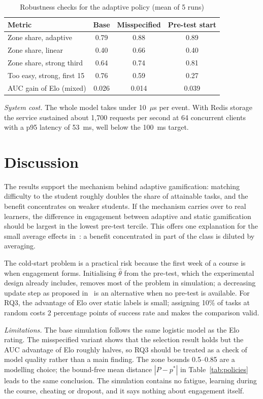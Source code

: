 \documentclass[conference]{IEEEtran}
\begin{document}
\begin{table}[t]
\caption{Robustness checks for the adaptive policy (mean of 5 runs)}
\label{tab:robust}
\centering
\begin{tabular}{@{}lccc@{}}
\toprule
Metric & Base & Misspecified & Pre-test start \\
\midrule
Zone share, adaptive & 0.79 & 0.88 & 0.89 \\
Zone share, linear & 0.40 & 0.66 & 0.40 \\
Zone share, strong third & 0.64 & 0.74 & 0.81 \\
Too easy, strong, first 15 & 0.76 & 0.59 & 0.27 \\
AUC gain of Elo (mixed) & 0.026 & 0.014 & 0.039 \\
\bottomrule
\end{tabular}
\end{table}

\textit{System cost.} The whole model takes under 10~$\mu$s per event. With Redis storage the service sustained about 1,700 requests per second at 64 concurrent clients with a p95 latency of 53~ms, well below the 100~ms target.

\section{Discussion}
The results support the mechanism behind adaptive gamification: matching difficulty to the student roughly doubles the share of attainable tasks, and the benefit concentrates on weaker students. If the mechanism carries over to real learners, the difference in engagement between adaptive and static gamification should be largest in the lowest pre-test tercile. This offers one explanation for the small average effects in~\cite{sailer2020}: a benefit concentrated in part of the class is diluted by averaging.

The cold-start problem is a practical risk because the first week of a course is when engagement forms. Initialising $\hat\theta$ from the pre-test, which the experimental design already includes, removes most of the problem in simulation; a decreasing update step as proposed in~\cite{pelanek2016} is an alternative when no pre-test is available. For RQ3, the advantage of Elo over static labels is small; assigning 10\% of tasks at random costs 2 percentage points of success rate and makes the comparison valid.

\textit{Limitations.} The base simulation follows the same logistic model as the Elo rating. The misspecified variant shows that the selection result holds but the AUC advantage of Elo roughly halves, so RQ3 should be treated as a check of model quality rather than a main finding. The zone bounds 0.5--0.85 are a modelling choice; the bound-free mean distance $|P - p^{*}|$ in Table~\ref{tab:policies} leads to the same conclusion. The simulation contains no fatigue, learning during the course, cheating or dropout, and it says nothing about engagement itself.
\end{document}
